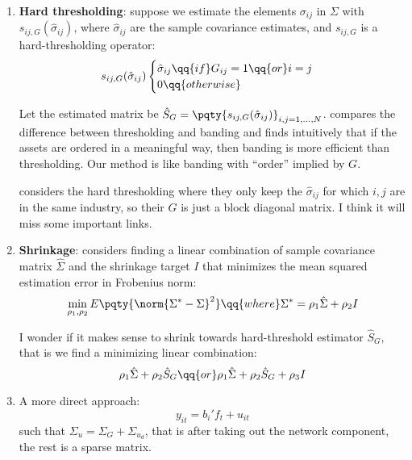     \begin{enumerate}
        \item \textbf{Hard thresholding}: suppose we estimate the elements \(\sigma_{ij}\) in  \(\Sigma\) with \(s_{ij,G}(\hat{\sigma}_{ij})\), where \(\hat{\sigma}_{ij}\) are the sample covariance estimates, and \(s_{ij,G}\) is a hard-thresholding operator:
        \begin{equation}
            s_{ij,G}(\hat{\sigma}_{ij})
            \begin{cases}
                \hat{\sigma}_{ij} \qq{if} G_{ij} =1 \qq{or} i=j \\
                0 \qq{otherwise}
            \end{cases}
        \end{equation}

        Let the estimated matrix be \(\hat{S}_{G} = \pqty{s_{ij,G}(\hat{\sigma}_{ij})}_{i,j = 1,\dots, N}\). 
        \cite{bickel2008RegularizedEstimation} compares the difference between thresholding and banding and finds intuitively that if the assets are ordered in a meaningful way, then banding is more efficient than thresholding. Our method is like banding with ``order'' implied by \(G\). 

        \cite{fan2016IncorporatingGlobal} considers the hard thresholding where they only keep the \(\hat{\sigma}_{ij} \) for which \(i,j\) are in the same industry, so their \(G\) is just a block diagonal matrix. I think it will miss some important links. 

        \item \textbf{Shrinkage}: \cite{ledoit2004WellconditionedEstimator} considers finding a linear combination of sample covariance matrix \(\hat{\Sigma}\) and the shrinkage target \(I\) that minimizes the mean squared estimation error in Frobenius norm:
        \begin{equation}
            \min_{\rho_{1},\rho_{2}} E\pqty{\norm{\Sigma^{*} - \Sigma}^{2}} \qq{where} \Sigma^{*} = \rho_{1} \hat{\Sigma} + \rho_{2} I 
        \end{equation}

        I wonder if it makes sense to shrink towards hard-threshold estimator \(\hat{S}_{G}\), that is we find a minimizing linear combination:
        \begin{equation}
            \rho_{1}\hat{\Sigma} +\rho_{2}\hat{S}_{G} \qq{or} \rho_{1}\hat{\Sigma} +\rho_{2}\hat{S}_{G}  + \rho_{3} I
        \end{equation}

        \item A more direct approach:
        \begin{equation*}
            y_{it} = b_{i}'f_{t} + u_{it}
        \end{equation*}
        such that \(\Sigma_{u} = \Sigma_{G} + \Sigma_{u_{d}}\), that is after taking out the network component, the rest is a sparse matrix. 
    \end{enumerate}

